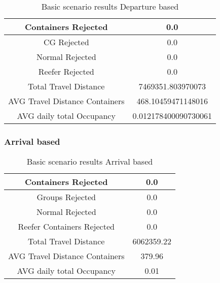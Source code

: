 \documentclass[]{article}
\begin{document}
\begin{table}[h]
      \centering
      \begin{tabular}{|c|c|}
            \hline
            Containers Rejected            & 0.0                  \\ \hline
            CG Rejected                    & 0.0                  \\ \hline
            Normal Rejected                & 0.0                  \\ \hline
            Reefer Rejected                & 0.0                  \\ \hline
            Total Travel Distance          & 7469351.803970073    \\ \hline
            AVG Travel Distance Containers & 468.10459471148016   \\ \hline
            AVG daily total Occupancy      & 0.012178400090730061 \\ \hline
      \end{tabular}
      \caption{Basic scenario results \- Departure based}\label{Departure based}
\end{table}

\subsubsection{Arrival based}
\begin{table}[h]
      \centering
      \begin{tabular}{|c|c|}
            \hline
            Containers Rejected            & 0.0        \\ \hline
            Groups Rejected                & 0.0        \\ \hline
            Normal Rejected                & 0.0        \\ \hline
            Reefer Containers Rejected     & 0.0        \\ \hline
            Total Travel Distance          & 6062359.22 \\ \hline
            AVG Travel Distance Containers & 379.96     \\ \hline
            AVG daily total Occupancy      & 0.01       \\ \hline
      \end{tabular}
      \caption{Basic scenario results \- Arrival based}\label{Arrival based}
\end{table}
\end{document}

